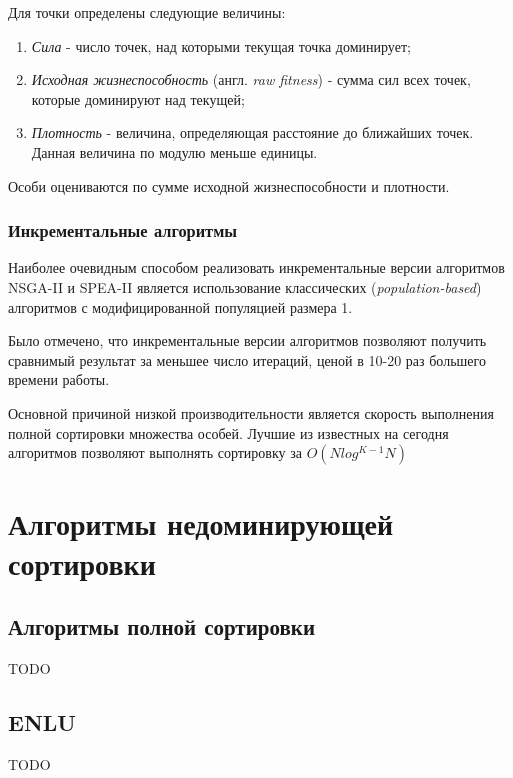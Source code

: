 Для точки определены следующие величины: \cite{spea2}
\begin{enumerate}
 \item \textit{Сила} - число точек, над которыми текущая точка доминирует;
 \item \textit{Исходная жизнеспособность} (англ. \textit{raw fitness}) - сумма сил всех точек, 
	которые доминируют над текущей;
 \item \textit{Плотность} - величина, определяющая расстояние до ближайших точек.
	Данная величина по модулю меньше единицы.
\end{enumerate}

Особи оцениваются по сумме исходной жизнеспособности и плотности.

\subsubsection{Инкрементальные алгоритмы}
Наиболее очевидным способом реализовать инкрементальные версии алгоритмов NSGA-II и SPEA-II
является использование классических (\textit{population-based}) алгоритмов с модифицированной
популяцией размера 1. \cite{inc_nsga2_spea2}

Было отмечено, что инкрементальные версии алгоритмов позволяют получить сравнимый результат
за меньшее число итераций, ценой в 10-20 раз большего времени работы.

Основной причиной низкой производительности является скорость выполнения полной сортировки
множества особей. Лучшие из известных на сегодня алгоритмов позволяют выполнять сортировку 
за $O(Nlog^{K-1}N)$

\section{Алгоритмы недоминирующей сортировки}
\subsection{Алгоритмы полной сортировки}
TODO
\subsection{ENLU}
TODO